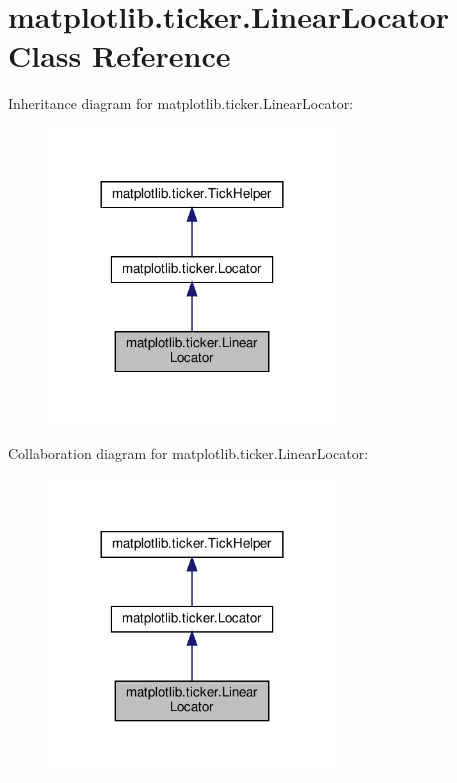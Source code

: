 \hypertarget{classmatplotlib_1_1ticker_1_1LinearLocator}{}\section{matplotlib.\+ticker.\+Linear\+Locator Class Reference}
\label{classmatplotlib_1_1ticker_1_1LinearLocator}


Inheritance diagram for matplotlib.\+ticker.\+Linear\+Locator\+:
\nopagebreak
\begin{figure}[H]
\begin{center}
\leavevmode
\includegraphics[width=216pt]{classmatplotlib_1_1ticker_1_1LinearLocator__inherit__graph}
\end{center}
\end{figure}


Collaboration diagram for matplotlib.\+ticker.\+Linear\+Locator\+:
\nopagebreak
\begin{figure}[H]
\begin{center}
\leavevmode
\includegraphics[width=216pt]{classmatplotlib_1_1ticker_1_1LinearLocator__coll__graph}
\end{center}
\end{figure}
